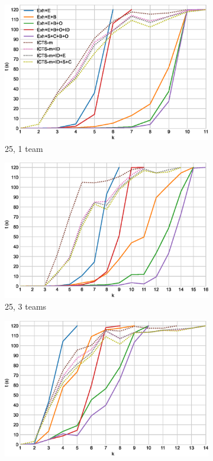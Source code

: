 \documentclass[english,10pt]{article}
\begin{document}
	\printbibliography
	\begin{figure}[b]
		\centering
		\begin{subfigure}{0.44\textwidth}
			\centering
			\includegraphics[width=\linewidth]{img/results/icts-comparison/25-1}
			\caption{25, 1 team}
			\label{fig:25-1}
		\end{subfigure}
		\begin{subfigure}{0.44\textwidth}
			\centering
			\includegraphics[width=\linewidth]{img/results/icts-comparison/25-3}
			\caption{25, 3 teams}
			\label{fig:25-3}
		\end{subfigure}
		\begin{subfigure}{0.44\textwidth}
			\centering
			\includegraphics[width=\linewidth]{img/results/icts-comparison/75-1}

\end{subfigure}
\end{figure}
\end{document}
